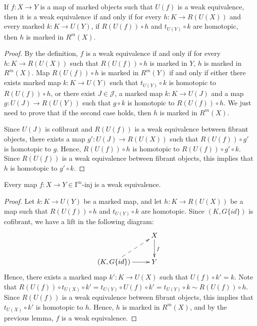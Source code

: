 \documentclass[reqno]{amsart}
\theoremstyle{definition}
\theoremstyle{remark}
\newcommand{\I}{\mathrm{I}}
\newcommand{\class}[2]{#1\text{-}\mathrm{#2}}
\newcommand{\Iinj}[1][\I]{\class{#1}{inj}}
\numberwithin{figure}{section}
\begin{document}
\begin{lem}[we]
If $f : X \to Y$ is a map of marked objects such that $U(f)$ is a weak equivalence,
then it is a weak equivalence if and only if for every $h : K \to R(U(X))$ and every marked $k : K \to U(Y)$,
if $R(U(f)) \circ h$ and $t_{U(Y)} \circ k$ are homotopic, then $h$ is marked in $R^m(X)$.
\end{lem}
\begin{proof}
By the definition, $f$ is a weak equivalence if and only if for every $h : K \to R(U(X))$ such that $R(U(f)) \circ h$ is marked in $Y$, $h$ is marked in $R^m(X)$.
Map $R(U(f)) \circ h$ is marked in $R^m(Y)$ if and only if either there exists marked map $k : K \to U(Y)$ such that $t_{U(Y)} \circ k$ is homotopic to $R(U(f)) \circ h$,
or there exist $J \in \mathcal{J}$, a marked map $k : K \to U(J)$ and a map $g : U(J) \to R(U(Y))$ such that $g \circ k$ is homotopic to $R(U(f)) \circ h$.
We just need to prove that if the second case holds, then $h$ is marked in $R^m(X)$.

Since $U(J)$ is cofibrant and $R(U(f))$ is a weak equivalence between fibrant objects,
there exists a map $g' : U(J) \to R(U(X))$ such that $R(U(f)) \circ g'$ is homotopic to $g$.
Hence, $R(U(f)) \circ h$ is homotopic to $R(U(f)) \circ g' \circ k$.
Since $R(U(f))$ is a weak equivalence between fibrant objects, this implies that $h$ is homotopic to $g' \circ k$.
\end{proof}

\begin{prop}[iinj]
Every map $f : X \to Y \in \Iinj[\I^m]$ is a weak equivalence.
\end{prop}
\begin{proof}
Let $k : K \to U(Y)$ be a marked map, and let $h : K \to R(U(X))$ be a map such that $R(U(f)) \circ h$ and $t_{U(Y)} \circ k$ are homotopic.
Since $(K, G \{id\})$ is cofibrant, we have a lift in the following diagram:
\[ \xymatrix{                                    & X \ar[d]^f \\
              (K, G \{id\}) \ar[r] \ar@{-->}[ur] & Y
            } \]
Hence, there exists a marked map $k' : K \to U(X)$ such that $U(f) \circ k' = k$.
Note that $R(U(f)) \circ t_{U(X)} \circ k' = t_{U(Y)} \circ U(f) \circ k' = t_{U(Y)} \circ k \sim R(U(f)) \circ h$.
Since $R(U(f))$ is a weak equivalence between fibrant objects, this implies that $t_{U(X)} \circ k'$ is homotopic to $h$.
Hence, $h$ is marked in $R^m(X)$, and by the previous lemma, $f$ is a weak equivalence.
\end{proof}
\end{document}
